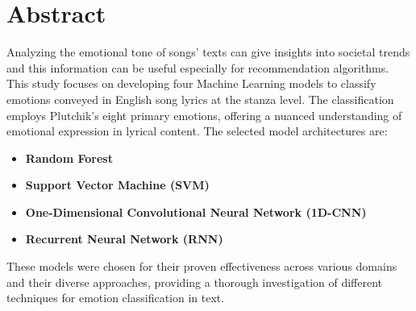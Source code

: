 \firstchapter
\chapter*{Abstract}
\label{ch:abstract}


Analyzing the emotional tone of songs' texts can give insights into societal trends and this information can be useful especially for recommendation
algorithms. This study focuses on developing four Machine Learning models to classify
emotions conveyed in English song lyrics at the stanza level. The
classification employs Plutchik's eight primary emotions,
offering a nuanced understanding of emotional expression in lyrical content.
The selected model architectures are:
\begin{itemize}
    \item \textbf{Random Forest}
    \item \textbf{Support Vector Machine (SVM)}
    \item \textbf{One-Dimensional Convolutional Neural Network (1D-CNN)}
    \item \textbf{Recurrent Neural Network (RNN)}
\end{itemize}
These models were chosen for their proven effectiveness across various
domains and their diverse approaches, providing a thorough
investigation of different techniques for emotion classification in text.\\
